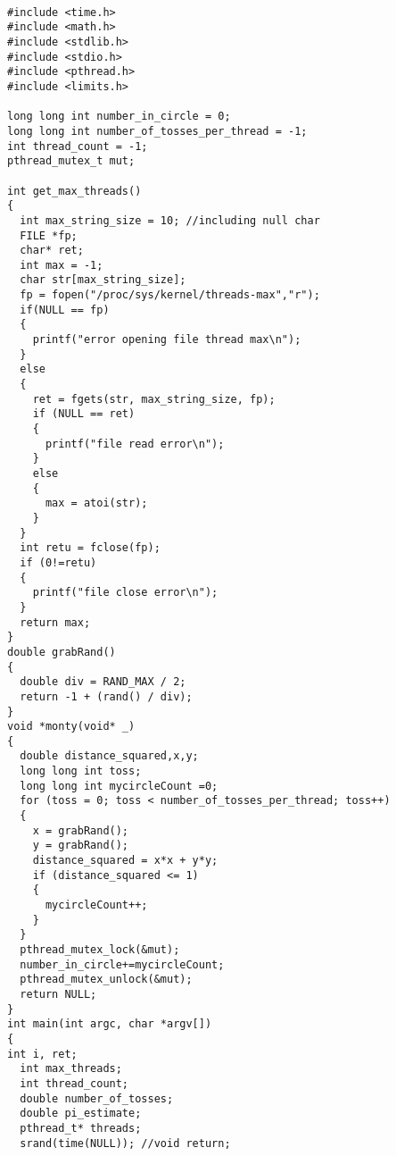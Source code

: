 \documentclass{article}
\begin{document}
\begin{lstlisting}

#include <time.h>
#include <math.h>
#include <stdlib.h>
#include <stdio.h>
#include <pthread.h>
#include <limits.h>

long long int number_in_circle = 0;
long long int number_of_tosses_per_thread = -1;
int thread_count = -1; 
pthread_mutex_t mut;

int get_max_threads()
{
  int max_string_size = 10; //including null char
  FILE *fp;
  char* ret;
  int max = -1;
  char str[max_string_size];
  fp = fopen("/proc/sys/kernel/threads-max","r");
  if(NULL == fp)
  {
    printf("error opening file thread max\n");
  }
  else
  {
    ret = fgets(str, max_string_size, fp);
    if (NULL == ret)
    {
      printf("file read error\n");
    }
    else
    {
      max = atoi(str);
    }
  }
  int retu = fclose(fp);
  if (0!=retu)
  {
    printf("file close error\n");
  }
  return max;
}
double grabRand() 
{
  double div = RAND_MAX / 2;
  return -1 + (rand() / div);
}
void *monty(void* _)
{
  double distance_squared,x,y;
  long long int toss;
  long long int mycircleCount =0;
  for (toss = 0; toss < number_of_tosses_per_thread; toss++)
  {
    x = grabRand();
    y = grabRand();
    distance_squared = x*x + y*y;
    if (distance_squared <= 1)
    {
      mycircleCount++;
    }
  }
  pthread_mutex_lock(&mut);
  number_in_circle+=mycircleCount; 
  pthread_mutex_unlock(&mut);
  return NULL;
}
int main(int argc, char *argv[])
{
int i, ret;
  int max_threads;
  int thread_count;
  double number_of_tosses;
  double pi_estimate;
  pthread_t* threads;
  srand(time(NULL)); //void return;


\end{lstlisting}
\end{document}
